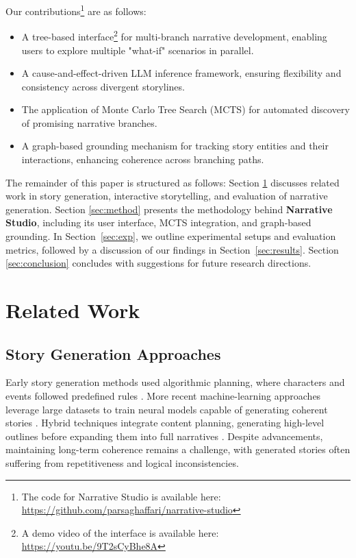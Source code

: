 \documentclass[11pt]{article}
\begin{document}
Our contributions\footnote{The code for Narrative Studio is available here: \href{https://github.com/parsaghaffari/narrative-studio}{https://github.com/parsaghaffari/narrative-studio}} are as follows:
\begin{itemize}
    \item A tree-based interface\footnote{A demo video of the interface is available here: \href{https://youtu.be/9T2sCyBhe8A}{https://youtu.be/9T2sCyBhe8A}} for multi-branch narrative development, enabling users to explore multiple "what-if" scenarios in parallel.
    \item A cause-and-effect-driven LLM inference framework, ensuring flexibility and consistency across divergent storylines.
    \item The application of Monte Carlo Tree Search (MCTS) for automated discovery of promising narrative branches.
    \item A graph-based grounding mechanism for tracking story entities and their interactions, enhancing coherence across branching paths.
\end{itemize}

The remainder of this paper is structured as follows: Section \ref{sec:related} discusses related work in story generation, interactive storytelling, and evaluation of narrative generation. Section \ref{sec:method} presents the methodology behind \textbf{Narrative Studio}, including its user interface, MCTS integration, and graph-based grounding. In Section~\ref{sec:exp}, we outline experimental setups and evaluation metrics, followed by a discussion of our findings in Section~\ref{sec:results}. Section \ref{sec:conclusion} concludes with suggestions for future research directions.

\section{Related Work}\label{sec:related}

\subsection{Story Generation Approaches}
Early story generation methods used algorithmic planning, where characters and events followed predefined rules \citep{meehan1977tale, lebowitz1984storytelling}. More recent machine-learning approaches leverage large datasets to train neural models capable of generating coherent stories \citep{du2023narrative, hong2023story, akoury2020story, louis2018deep, fan2018hierarchical}. Hybrid techniques integrate content planning, generating high-level outlines before expanding them into full narratives \citep{yao2019plan, goldfarb2020content, huang2024whatifexploringbranchingnarratives}. Despite advancements, maintaining long-term coherence remains a challenge, with generated stories often suffering from repetitiveness and logical inconsistencies.
\end{document}
